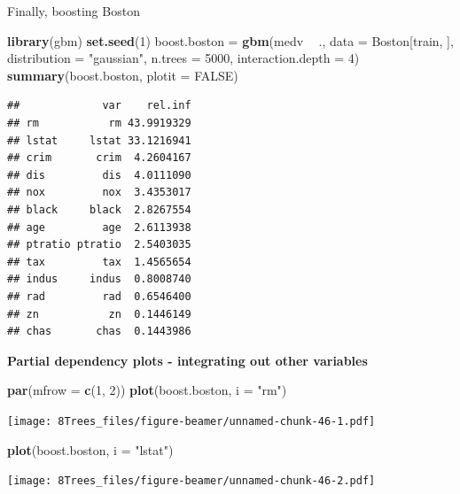 \documentclass[10pt,ignorenonframetext,]{beamer}
\newenvironment{Shaded}{\begin{snugshade}}{\end{snugshade}}
\newcommand{\KeywordTok}[1]{\textcolor[rgb]{0.13,0.29,0.53}{\textbf{#1}}}
\newcommand{\DataTypeTok}[1]{\textcolor[rgb]{0.13,0.29,0.53}{#1}}
\newcommand{\DecValTok}[1]{\textcolor[rgb]{0.00,0.00,0.81}{#1}}
\newcommand{\StringTok}[1]{\textcolor[rgb]{0.31,0.60,0.02}{#1}}
\newcommand{\OtherTok}[1]{\textcolor[rgb]{0.56,0.35,0.01}{#1}}
\newcommand{\OperatorTok}[1]{\textcolor[rgb]{0.81,0.36,0.00}{\textbf{#1}}}
\newcommand{\NormalTok}[1]{#1}
\begin{document}
\begin{frame}[fragile]

\begin{block}{Finally, boosting Boston}

\begin{Shaded}
\begin{Highlighting}[]
\KeywordTok{library}\NormalTok{(gbm)}
\KeywordTok{set.seed}\NormalTok{(}\DecValTok{1}\NormalTok{)}
\NormalTok{boost.boston =}\StringTok{ }\KeywordTok{gbm}\NormalTok{(medv }\OperatorTok{~}\StringTok{ }\NormalTok{., }\DataTypeTok{data =}\NormalTok{ Boston[train, ], }\DataTypeTok{distribution =} \StringTok{"gaussian"}\NormalTok{, }
    \DataTypeTok{n.trees =} \DecValTok{5000}\NormalTok{, }\DataTypeTok{interaction.depth =} \DecValTok{4}\NormalTok{)}
\KeywordTok{summary}\NormalTok{(boost.boston, }\DataTypeTok{plotit =} \OtherTok{FALSE}\NormalTok{)}
\end{Highlighting}
\end{Shaded}

\begin{verbatim}
##             var    rel.inf
## rm           rm 43.9919329
## lstat     lstat 33.1216941
## crim       crim  4.2604167
## dis         dis  4.0111090
## nox         nox  3.4353017
## black     black  2.8267554
## age         age  2.6113938
## ptratio ptratio  2.5403035
## tax         tax  1.4565654
## indus     indus  0.8008740
## rad         rad  0.6546400
## zn           zn  0.1446149
## chas       chas  0.1443986
\end{verbatim}

\end{block}

\end{frame}

\begin{frame}[fragile]

\textbf{Partial dependency plots - integrating out other variables }

\begin{Shaded}
\begin{Highlighting}[]
\KeywordTok{par}\NormalTok{(}\DataTypeTok{mfrow =} \KeywordTok{c}\NormalTok{(}\DecValTok{1}\NormalTok{, }\DecValTok{2}\NormalTok{))}
\KeywordTok{plot}\NormalTok{(boost.boston, }\DataTypeTok{i =} \StringTok{"rm"}\NormalTok{)}
\end{Highlighting}
\end{Shaded}

\texttt{[image: 8Trees\_files/figure-beamer/unnamed-chunk-46-1.pdf]}

\begin{Shaded}
\begin{Highlighting}[]
\KeywordTok{plot}\NormalTok{(boost.boston, }\DataTypeTok{i =} \StringTok{"lstat"}\NormalTok{)}
\end{Highlighting}
\end{Shaded}

\texttt{[image: 8Trees\_files/figure-beamer/unnamed-chunk-46-2.pdf]}

\end{frame}
\end{document}
